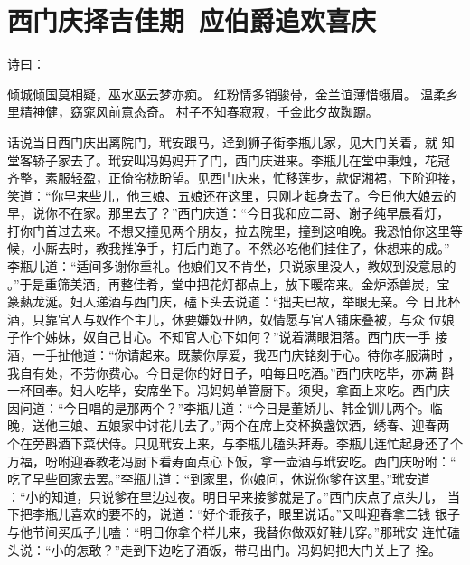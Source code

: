 \chapter{西门庆择吉佳期~应伯爵追欢喜庆}

诗曰：

倾城倾国莫相疑，巫水巫云梦亦痴。
红粉情多销骏骨，金兰谊薄惜蛾眉。
温柔乡里精神健，窈窕风前意态奇。
村子不知春寂寂，千金此夕故踟蹰。

话说当日西门庆出离院门，玳安跟马，迳到狮子街李瓶儿家，见大门关着，就
知堂客轿子家去了。玳安叫冯妈妈开了门，西门庆进来。李瓶儿在堂中秉烛，花冠
齐整，素服轻盈，正倚帘栊盼望。见西门庆来，忙移莲步，款促湘裙，下阶迎接，
笑道：“你早来些儿，他三娘、五娘还在这里，只刚才起身去了。今日他大娘去的
早，说你不在家。那里去了？”西门庆道：“今日我和应二哥、谢子纯早晨看灯，
打你门首过去来。不想又撞见两个朋友，拉去院里，撞到这咱晚。我恐怕你这里等
候，小厮去时，教我推净手，打后门跑了。不然必吃他们挂住了，休想来的成。”
李瓶儿道：“适间多谢你重礼。他娘们又不肯坐，只说家里没人，教奴到没意思的
。”于是重筛美酒，再整佳肴，堂中把花灯都点上，放下暖帘来。金炉添兽炭，宝
篆爇龙涎。妇人递酒与西门庆，磕下头去说道：“拙夫已故，举眼无亲。今
日此杯酒，只靠官人与奴作个主儿，休要嫌奴丑陋，奴情愿与官人铺床叠被，与众
位娘子作个姊妹，奴自己甘心。不知官人心下如何？”说着满眼泪落。西门庆一手
接酒，一手扯他道：“你请起来。既蒙你厚爱，我西门庆铭刻于心。待你孝服满时
，我自有处，不劳你费心。今日是你的好日子，咱每且吃酒。”西门庆吃毕，亦满
斟一杯回奉。妇人吃毕，安席坐下。冯妈妈单管厨下。须臾，拿面上来吃。西门庆
因问道：“今日唱的是那两个？”李瓶儿道：“今日是董娇儿、韩金钏儿两个。临
晚，送他三娘、五娘家中讨花儿去了。”两个在席上交杯换盏饮酒，绣春、迎春两
个在旁斟酒下菜伏侍。只见玳安上来，与李瓶儿磕头拜寿。李瓶儿连忙起身还了个
万福，吩咐迎春教老冯厨下看寿面点心下饭，拿一壶酒与玳安吃。西门庆吩咐：“
吃了早些回家去罢。”李瓶儿道：“到家里，你娘问，休说你爹在这里。”玳安道
：“小的知道，只说爹在里边过夜。明日早来接爹就是了。”西门庆点了点头儿，
当下把李瓶儿喜欢的要不的，说道：“好个乖孩子，眼里说话。”又叫迎春拿二钱
银子与他节间买瓜子儿嗑：“明日你拿个样儿来，我替你做双好鞋儿穿。”那玳安
连忙磕头说：“小的怎敢？”走到下边吃了酒饭，带马出门。冯妈妈把大门关上了
拴。

